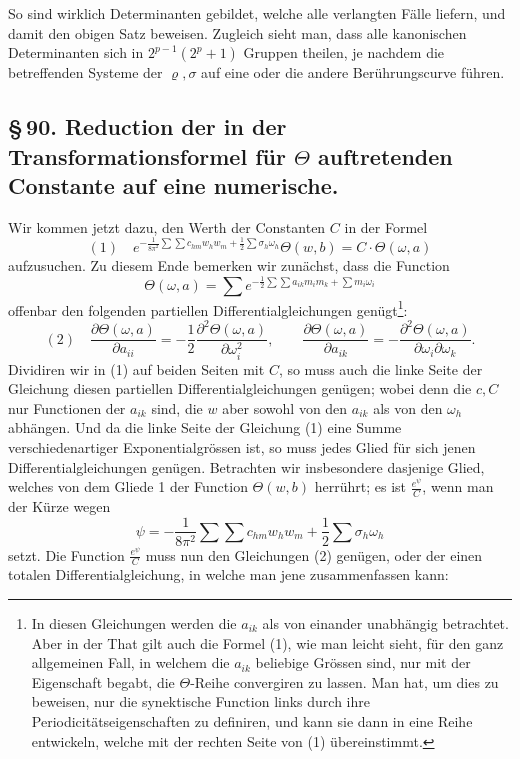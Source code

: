 \documentclass[10pt]{article}
\begin{document}
So sind wirklich Determinanten gebildet, welche alle verlangten Fälle liefern, und damit den obigen Satz beweisen. Zugleich sieht man, dass alle kanonischen Determinanten sich in \(2^{p-1}(2^p+1)\) Gruppen theilen, je nachdem die betreffenden Systeme der \(\varrho,\sigma\) auf eine oder die andere Berührungscurve führen.

\subsection*{\S\,90. Reduction der in der Transformationsformel für \(\Theta\) auftretenden Constante auf eine numerische.}

Wir kommen jetzt dazu, den Werth der Constanten \(C\) in der Formel
\[
(1)\quad
e^{-\frac{1}{8\pi^2}\sum\sum c_{hm}w_hw_m+\frac12\sum\sigma_h\omega_h}
\Theta(w,b)
=C\cdot\Theta(\omega,a)
\]
aufzusuchen. Zu diesem Ende bemerken wir zunächst, dass die Function
\[
\Theta(\omega,a)=\sum e^{-\frac12\sum\sum a_{ik}m_im_k+\sum m_i\omega_i}
\]
offenbar den folgenden partiellen Differentialgleichungen genügt\footnote{In diesen Gleichungen werden die \(a_{ik}\) als von einander unabhängig betrachtet. Aber in der That gilt auch die Formel (1), wie man leicht sieht, für den ganz allgemeinen Fall, in welchem die \(a_{ik}\) beliebige Grössen sind, nur mit der Eigenschaft begabt, die \(\Theta\)-Reihe convergiren zu lassen. Man hat, um dies zu beweisen, nur die synektische Function links durch ihre Periodicitätseigenschaften zu definiren, und kann sie dann in eine Reihe entwickeln, welche mit der rechten Seite von (1) übereinstimmt.}:
\[
(2)\quad
\frac{\partial\Theta(\omega,a)}{\partial a_{ii}}
=-\frac12\frac{\partial^2\Theta(\omega,a)}{\partial\omega_i^2},
\qquad
\frac{\partial\Theta(\omega,a)}{\partial a_{ik}}
=-\frac{\partial^2\Theta(\omega,a)}{\partial\omega_i\partial\omega_k}.
\]
Dividiren wir in (1) auf beiden Seiten mit \(C\), so muss auch die linke Seite der Gleichung diesen partiellen Differentialgleichungen genügen; wobei denn die \(c,C\) nur Functionen der \(a_{ik}\) sind, die \(w\) aber sowohl von den \(a_{ik}\) als von den \(\omega_h\) abhängen. Und da die linke Seite der Gleichung (1) eine Summe verschiedenartiger Exponentialgrössen ist, so muss jedes Glied für sich jenen Differentialgleichungen genügen. Betrachten wir insbesondere dasjenige Glied, welches von dem Gliede 1 der Function \(\Theta(w,b)\) herrührt; es ist \(\frac{e^\psi}{C}\), wenn man der Kürze wegen
\[
\psi=-\frac{1}{8\pi^2}\sum\sum c_{hm}w_hw_m+\frac12\sum\sigma_h\omega_h
\]
setzt. Die Function \(\frac{e^\psi}{C}\) muss nun den Gleichungen (2) genügen, oder der einen totalen Differentialgleichung, in welche man jene zusammenfassen kann:
\end{document}
